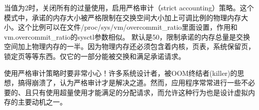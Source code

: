 当值为2时，关闭所有的过量使用，启用严格审计（strict accounting）策略。这个模式中，承诺的内存大小被严格限制在交换空间大小加上可调比例的物理内存大小。这个比例可以在文件/proc/sys/vm/overcommit\_ratio里面设置，作用和vm.overcommit\_ratio的sysctl参数相似。 默认是50，限制承诺的内存总量是交换空间加上物理内存的一半。因为物理内存还必须包含着内核，页表，系统保留页，锁定页等等东西。仅它的一部分能被交换和满足承诺请求。

使用严格审计策略时要非常小心！许多系统设计者，被OOM终结者(killer)的思想，搞得崩溃了，认为严格审计才是解决之道。然而，应用程序常常进行一些不必要的、且只有使用超量使用才能满足的分配请求，而允许这种行为也是设计虚拟内存的主要动机之一。 
